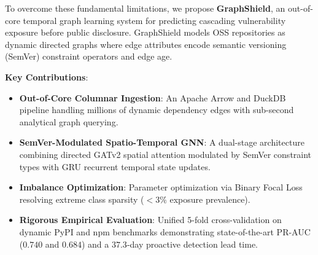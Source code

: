 \documentclass[sigconf,screen]{acmart}
\begin{document}
To overcome these fundamental limitations, we propose \textbf{GraphShield}, an out-of-core temporal graph learning system for predicting cascading vulnerability exposure before public disclosure. GraphShield models OSS repositories as dynamic directed graphs where edge attributes encode semantic versioning (SemVer) constraint operators and edge age.

\noindent\textbf{Key Contributions}:
\begin{itemize}
    \item \textbf{Out-of-Core Columnar Ingestion}: An Apache Arrow and DuckDB pipeline handling millions of dynamic dependency edges with sub-second analytical graph querying.
    \item \textbf{SemVer-Modulated Spatio-Temporal GNN}: A dual-stage architecture combining directed GATv2 spatial attention modulated by SemVer constraint types with GRU recurrent temporal state updates.
    \item \textbf{Imbalance Optimization}: Parameter optimization via Binary Focal Loss resolving extreme class sparsity ($<3\%$ exposure prevalence).
    \item \textbf{Rigorous Empirical Evaluation}: Unified 5-fold cross-validation on dynamic PyPI and npm benchmarks demonstrating state-of-the-art PR-AUC ($0.740$ and $0.684$) and a $37.3$-day proactive detection lead time.
\end{itemize}
\end{document}
